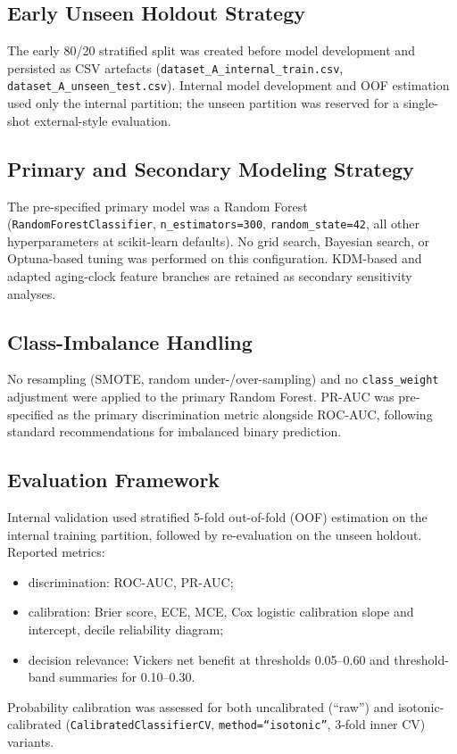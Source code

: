 \documentclass[11pt,a4paper]{article}
\begin{document}
\subsection{Early Unseen Holdout Strategy}
The early 80/20 stratified split was created before model development and persisted as CSV artefacts
(\texttt{dataset\_A\_internal\_train.csv}, \texttt{dataset\_A\_unseen\_test.csv}). Internal model
development and OOF estimation used only the internal partition; the unseen partition was reserved for
a single-shot external-style evaluation.

\subsection{Primary and Secondary Modeling Strategy}
The pre-specified primary model was a Random Forest (\texttt{RandomForestClassifier},
\texttt{n\_estimators=300}, \texttt{random\_state=42}, all other hyperparameters at scikit-learn
defaults). No grid search, Bayesian search, or Optuna-based tuning was performed on this configuration.
KDM-based and adapted aging-clock feature branches are retained as secondary sensitivity analyses.

\subsection{Class-Imbalance Handling}
No resampling (SMOTE, random under-/over-sampling) and no \texttt{class\_weight} adjustment were
applied to the primary Random Forest. PR-AUC was pre-specified as the primary discrimination metric
alongside ROC-AUC, following standard recommendations for imbalanced binary prediction.

\subsection{Evaluation Framework}
Internal validation used stratified 5-fold out-of-fold (OOF) estimation on the internal training
partition, followed by re-evaluation on the unseen holdout. Reported metrics:
\begin{itemize}
\item discrimination: ROC-AUC, PR-AUC;
\item calibration: Brier score, ECE, MCE, Cox logistic calibration slope and intercept,
      decile reliability diagram;
\item decision relevance: Vickers net benefit at thresholds 0.05--0.60 and threshold-band
      summaries for 0.10--0.30.
\end{itemize}
Probability calibration was assessed for both uncalibrated (``raw'') and isotonic-calibrated
(\texttt{CalibratedClassifierCV}, \texttt{method=``isotonic''}, 3-fold inner CV) variants.
\end{document}
